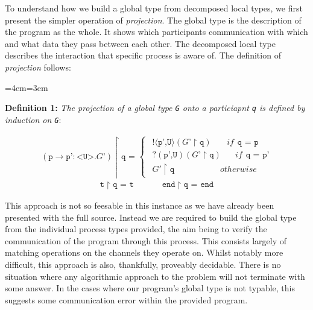 \documentclass[11pt, abstracton, twoside, titlepage=true]{scrartcl}
\newenvironment{blockquote}{
	\par
	\medskip
	\leftskip=4em\rightskip=3em
	\noindent\ignorespaces
}{
	\par\medskip
}
\begin{document}
To understand how we build a global type from decomposed local types, we first 
present the simpler operation of \emph{projection}. The global type is the
description of the program as the whole. It shows which participants 
communication with which and what data they pass between each other. The decomposed
local type describes the interaction that specific process is aware of. The 
definition of \emph{projection} follows:

\begin{blockquote}
  \textbf{Definition 1:} \emph{The projection of a global type \texttt{G} onto 
  a particiapnt \texttt{q} is defined by induction on \texttt{G}}:
\end{blockquote}
\begin{align*}
  (\texttt{p} \rightarrow \texttt{p'}:\texttt{<U>}.\texttt{$G$'}) \upharpoonright \texttt{q = }  
  \begin{cases}
\hspace{5pt} !\langle \texttt{p',U} \rangle (\texttt{$G$'}\upharpoonright \texttt{q}) \hspace{22pt}if \hspace{5pt} \texttt{q = p} \\
\hspace{5pt} ?(\texttt{p',U}) (\texttt{$G$'}\upharpoonright \texttt{q}) \hspace{20pt}if \hspace{5pt} \texttt{q = p'} \\
\hspace{5pt} \texttt{$G'$}\upharpoonright \texttt{q} \hspace{65pt} otherwise
  \end{cases}
\end{align*}
\begin{align*}
  \texttt{t} \upharpoonright \texttt{q = t} 
  \hspace{40pt} \texttt{end} \upharpoonright \texttt{q = end}
\end{align*}

This approach is not so feesable in this instance as we have already been 
presented with the full source. Instead we are required to build the global
type from the individual process types provided, the aim being to verify
the communication of the program through this process. This consists largely of 
matching operations on the channels they operate on. Whilst notably more
difficult, this approach is also, thankfully, proveably decidable. There is
no situation where any algorithmic approach to the problem will not terminate
with some answer. In the cases where our program's global type is not
typable, this suggests some communication error within the provided program.
\end{document}
